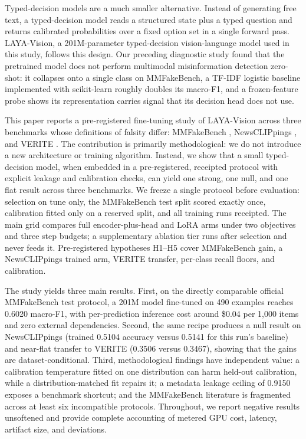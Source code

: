 \documentclass{article} %
\begin{document}
Typed-decision models are a much smaller alternative. Instead of generating free text, a typed-decision model reads a structured state plus a typed question and returns calibrated probabilities over a fixed option set in a single forward pass. LAYA-Vision, a 201M-parameter typed-decision vision-language model used in this study, follows this design. Our preceding diagnostic study found that the pretrained model does not perform multimodal misinformation detection zero-shot: it collapses onto a single class on MMFakeBench, a TF-IDF logistic baseline implemented with scikit-learn \citep{Pedregosa2011ScikitlearnMachine} roughly doubles its macro-F1, and a frozen-feature probe shows its representation carries signal that its decision head does not use.

This paper reports a pre-registered fine-tuning study of LAYA-Vision across three benchmarks whose definitions of falsity differ: MMFakeBench \citep{Liu2024MmfakebenchMixedsource}, NewsCLIPpings \citep{Luo2021NewsclippingsAutomatic}, and VERITE \citep{Papadopoulos2023VeriteRobust}. The contribution is primarily methodological: we do not introduce a new architecture or training algorithm. Instead, we show that a small typed-decision model, when embedded in a pre-registered, receipted protocol with explicit leakage and calibration checks, can yield one strong, one null, and one flat result across three benchmarks. We freeze a single protocol before evaluation: selection on tune only, the MMFakeBench test split scored exactly once, calibration fitted only on a reserved split, and all training runs receipted. The main grid compares full encoder-plus-head and LoRA arms under two objectives and three step budgets; a supplementary ablation tier runs after selection and never feeds it. Pre-registered hypotheses H1--H5 cover MMFakeBench gain, a NewsCLIPpings trained arm, VERITE transfer, per-class recall floors, and calibration.

The study yields three main results. First, on the directly comparable official MMFakeBench test protocol, a 201M model fine-tuned on 490 examples reaches 0.6020 macro-F1, with per-prediction inference cost around \$0.04 per 1,000 items and zero external dependencies. Second, the same recipe produces a null result on NewsCLIPpings (trained 0.5104 accuracy versus 0.5141 for this run's baseline) and near-flat transfer to VERITE (0.3506 versus 0.3467), showing that the gains are dataset-conditional. Third, methodological findings have independent value: a calibration temperature fitted on one distribution can harm held-out calibration, while a distribution-matched fit repairs it; a metadata leakage ceiling of 0.9150 exposes a benchmark shortcut; and the MMFakeBench literature is fragmented across at least six incompatible protocols. Throughout, we report negative results unsoftened and provide complete accounting of metered GPU cost, latency, artifact size, and deviations.
\end{document}
